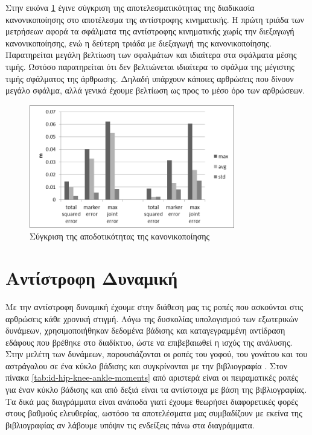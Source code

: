 Στην εικόνα \ref{fig:ik-no-scale-with-scale} έγινε σύγκριση της αποτελεσματικότητας της διαδικασία κανονικοποίησης στο αποτέλεσμα της αντίστροφης κινηματικής. Η πρώτη τριάδα των μετρήσεων αφορά τα σφάλματα της αντίστροφης κινηματικής χωρίς την διεξαγωγή κανονικοποίησης, ενώ η δεύτερη τριάδα με διεξαγωγή της κανονικοποίησης. Παρατηρείται μεγάλη βελτίωση των σφαλμάτων και ιδιαίτερα στα σφάλματα μέσης τιμής. Ωστόσο παρατηρείται ότι δεν βελτιώνεται ιδιαίτερα το σφάλμα της μέγιστης τιμής σφάλματος της άρθρωσης. Δηλαδή υπάρχουν κάποιες αρθρώσεις που δίνουν μεγάλο σφάλμα, αλλά γενικά έχουμε βελτίωση ως προς το μέσο όρο των αρθρώσεων.

\begin{figure}[H]
    \centering
    \includegraphics[width=0.8\textwidth, keepaspectratio]{fig/ik-no-scale-with-scale.png}
    \caption{Σύγκριση της αποδοτικότητας της κανονικοποίησης}
    \label{fig:ik-no-scale-with-scale}
\end{figure}

\section{Αντίστροφη Δυναμική}

Με την αντίστροφη δυναμική έχουμε στην διάθεση μας τις ροπές που ασκούνται στις αρθρώσεις κάθε χρονική στιγμή. Λόγω της δυσκολίας υπολογισμού των εξωτερικών δυνάμεων, χρησιμοποιήθηκαν δεδομένα βάδισης και καταγεγραμμένη αντίδραση εδάφους που βρέθηκε στο διαδίκτυο, ώστε να επιβεβαιωθεί η ισχύς της ανάλυσης. Στην μελέτη των δυνάμεων, παρουσιάζονται οι ροπές του γοφού, του γονάτου και του αστράγαλου σε ένα κύκλο βάδισης και συγκρίνονται με την βιβλιογραφία \cite{whittlesey}. Στον πίνακα \ref{tab:id-hip-knee-ankle-moments} από αριστερά είναι οι πειραματικές ροπές για έναν κύκλο βάδισης και από δεξιά είναι τα αντίστοιχα με βάση της βιβλιογραφίας. Τα δικά μας διαγράμματα είναι ανάποδα γιατί έχουμε θεωρήσει διαφορετικές φορές στους βαθμούς ελευθερίας, ωστόσο τα αποτελέσματα μας συμβαδίζουν με εκείνα της βιβλιογραφίας αν λάβουμε υπόψιν τις ενδείξεις πάνω στα διαγράμματα.

